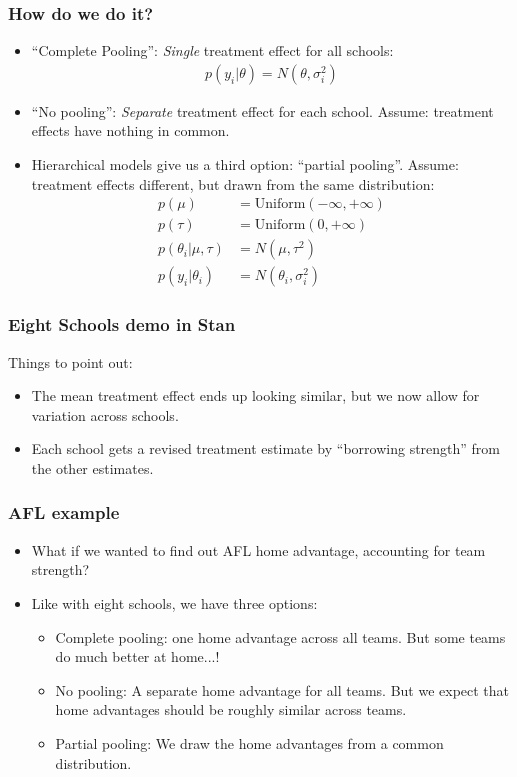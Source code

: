 \documentclass{beamer}
\begin{document}
\begin{frame}
	\frametitle{How do we do it?}
	\begin{itemize}
		\item ``Complete Pooling'': \emph{Single} treatment effect for all schools:
		\begin{align*}
			p(y_i | \theta) = N(\theta, \sigma_i^2)	
		\end{align*}
		\item ``No pooling'': \emph{Separate} treatment effect for each school. Assume: treatment effects have nothing in common.
		\item Hierarchical models give us a third option: ``partial pooling''. Assume: treatment effects different, but drawn from the same distribution:
		\begin{align*}
			p(\mu) & = \textrm{Uniform}(-\infty, +\infty) \\
			p(\tau) & = \textrm{Uniform}(0, +\infty) \\
			p(\theta_i | \mu, \tau) & = N(\mu, \tau^2) \\
			p(y_i | \theta_i) & = N(\theta_i, \sigma_i^2)
		\end{align*}
	\end{itemize}
\end{frame}

\begin{frame}[fragile]
\frametitle{Eight Schools demo in Stan}
Things to point out:
\begin{itemize}
	\item The mean treatment effect ends up looking similar, but we now allow for variation across schools.
	\item Each school gets a revised treatment estimate by ``borrowing strength'' from the other estimates.
\end{itemize}
\end{frame}

\begin{frame}
	\frametitle{AFL example}
	\begin{itemize}
		\item What if we wanted to find out AFL home advantage, accounting for team strength?
		\item Like with eight schools, we have three options:
		\begin{itemize}
			\item Complete pooling: one home advantage across all teams. But some teams do much better at home...!
			\item No pooling: A separate home advantage for all teams. But we expect that home advantages should be roughly similar across teams.
			\item Partial pooling: We draw the home advantages from a common distribution.
		\end{itemize}
	\end{itemize}
\end{frame}
\end{document}
